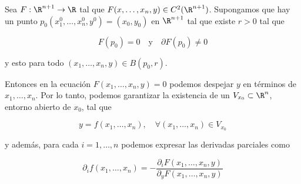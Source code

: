 \begin{teo}\label{teo:3.1.2}
    Sea $F: \R^{n+1} \rightarrow \R$ tal que $F(x, \dots, x_n, y) \in C^2(\R^{n+1})$. Supongamos que hay un punto $p_0(x_1^0, \dots, x_n^0, y^0) = (x_0, y_0)$ en $\R^{n+1}$ tal que existe $r > 0$ tal que
    
    \[
    F(p_0) = 0 \quad \text{y} \quad \partial F(p_0) \neq 0
    \]
    
    \noindent y esto para todo $(x_1, \dots, x_n, y) \in B(p_0, r)$.
    
    Entonces en la ecuación $F(x_1, \dots, x_n, y) = 0$ podemos despejar $y$ en términos de $x_1, \dots, x_n$. Por lo tanto, podemos garantizar la existencia de un $V_{x_0} \subset \R^n $, entorno abierto de $x_0$, tal que
    
    \[
    y = f(x_1, \dots, x_n), \quad \forall (x_1, \dots, x_n) \in V_{x_0}
    \]
    
    \noindent y además, para cada $i = 1, \dots, n$ podemos expresar las derivadas parciales como
    
    \[
    \partial_i f(x_1, \dots, x_n) = - \dfrac{\partial_i F(x_1, \dots, x_n, y)}{\partial_y F(x_1, \dots, x_n, y)}
    \]
\end{teo}


